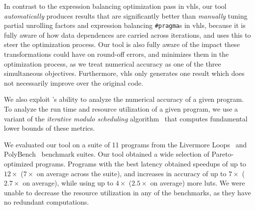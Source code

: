 In contrast to the expression balancing optimization pass in \gls{vhls},
our tool \emph{automatically} produces results that are significantly
better than \emph{manually} tuning partial unrolling factors and expression
balancing \verb|#pragma|s in \gls{vhls}, because it is fully aware of how
data dependences are carried across iterations, and uses this to steer the
optimization process.  Our tool is also fully aware of the impact these
transformations could have on round-off errors, and minimizes them in the
optimization process, as we treat numerical accuracy as one of the three
simultaneous objectives.  Furthermore, \gls{vhls} only generates one result
which does not necessarily improve over the original code.


We also exploit \soap{}'s ability to analyze the numerical accuracy of
a given program.  To analyze the run time and resource utilization of a
given program, we use a variant of the \emph{iterative modulo scheduling}
algorithm~\cite{rau94} that computes fundamental lower bounds of these metrics.

We evaluated our tool on a suite of 11 programs from the Livermore
Loops~\cite{livermore} and PolyBench~\cite{polybench} benchmark suites.  Our
tool obtained a wide selection of Pareto-optimized programs.  Programs with
the best latency obtained speedups of up to $12\times$ ($7\times$ on average
across the suite), and increases in accuracy of up to $7\times$ ($2.7\times$
on average), while using up to $4\times$ ($2.5\times$ on average) more
\glspl{lut}.  We were unable to decrease the resource utilization in any of the
benchmarks, as they have no redundant computations.

